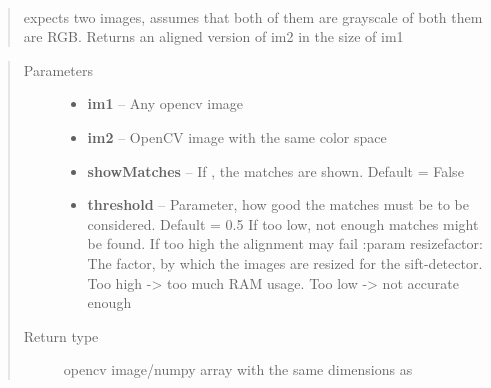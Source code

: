 \documentclass[a4paper,10pt,openany,oneside]{sphinxmanual}
\begin{document}
\begin{fulllineitems}
\label{index:scripts.image_processing.alignImages}~\begin{quote}

expects two images, assumes that both of them are grayscale of both them are RGB.
Returns an aligned version of im2 in the size of im1
\end{quote}
\begin{quote}\begin{description}
\item[{Parameters}] \leavevmode\begin{itemize}
\item {}
\textbf{im1} -- Any opencv image

\item {}
\textbf{im2} -- OpenCV image with the same color space

\item {}
\textbf{showMatches} -- If , the matches are shown. Default = False

\item {}
\textbf{threshold} -- Parameter, how good the matches must be to be considered. Default = 0.5 If too low, not enough matches might be found. If too high the alignment may fail
:param resizefactor:  The factor, by which the images are resized for the sift-detector. Too high -\textgreater{} too much RAM usage. Too low -\textgreater{} not accurate enough

\end{itemize}

\item[{Return type}] \leavevmode
opencv image/numpy array with the same dimensions as 

\end{description}\end{quote}

\end{fulllineitems}

\end{document}
